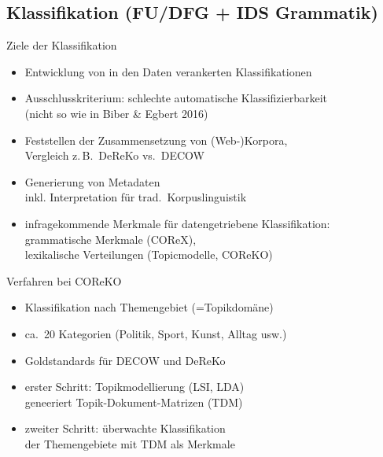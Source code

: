 \subsection{Klassifikation (FU/DFG + IDS Grammatik)}

\begin{frame}
  {Ziele der Klassifikation}
  \begin{itemize}
    \item Entwicklung von in den Daten verankerten Klassifikationen
    \item Ausschlusskriterium: schlechte automatische Klassifizierbarkeit\\
      (\alert{nicht} so wie in Biber & Egbert 2016)
    \item Feststellen der Zusammensetzung von (Web-)Korpora,\\
      Vergleich z.\,B.\ DeReKo vs.\ DECOW
    \item Generierung von Metadaten\\
      inkl. \alert{Interpretation} für trad.\ Korpuslinguistik
    \item infragekommende Merkmale für datengetriebene Klassifikation:\\
      \alert{grammatische Merkmale} (COReX),\\
      \alert{lexikalische Verteilungen} (Topicmodelle, COReKO)
  \end{itemize}
\end{frame}

\begin{frame}
  {Verfahren bei COReKO}
  \begin{itemize}
    \item Klassifikation nach \alert{Themengebiet} (=Topikdomäne)
    \item ca.\ 20 Kategorien (Politik, Sport, Kunst, Alltag usw.)
    \item Goldstandards für DECOW und DeReKo
    \item erster Schritt: \alert{Topikmodellierung} (LSI, LDA)\\
      geneeriert Topik-Dokument-Matrizen (TDM)
    \item zweiter Schritt: \alert{überwachte Klassifikation}\\
      der Themengebiete mit TDM als Merkmale
  \end{itemize}
\end{frame}

